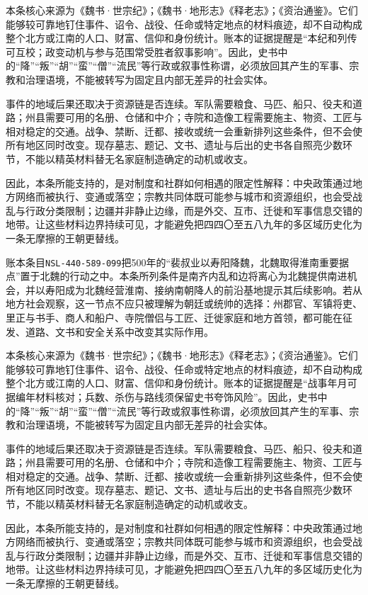 本条核心来源为《魏书·世宗纪》；《魏书·地形志》《释老志》；《资治通鉴》。它们能够较可靠地钉住事件、诏令、战役、任命或特定地点的材料痕迹，却不自动构成整个北方或江南的人口、财富、信仰和身份统计。账本的证据提醒是“本纪和列传可互校；政变动机与参与范围常受胜者叙事影响”。因此，史书中的“降”“叛”“胡”“蛮”“僧”“流民”等行政或叙事性称谓，必须放回其产生的军事、宗教和治理语境，不能被转写为固定且内部无差异的社会实体。

事件的地域后果还取决于资源链是否连续。军队需要粮食、马匹、船只、役夫和道路；州县需要可用的名册、仓储和中介；寺院和造像工程需要施主、物资、工匠与相对稳定的交通。战争、禁断、迁都、接收或统一会重新排列这些条件，但不会使所有地区同时改变。现存墓志、题记、文书、遗址与后出的史书各自照亮少数环节，不能以精英材料替无名家庭制造确定的动机或收支。

因此，本条所能支持的，是对制度和社群如何相遇的限定性解释：中央政策通过地方网络而被执行、变通或落空；宗教共同体既可能参与城市和资源组织，也会受战乱与行政分类限制；边疆并非静止边缘，而是外交、互市、迁徙和军事信息交错的地带。让这些材料边界持续可见，才能避免把四四〇至五八九年的多区域历史化为一条无摩擦的王朝更替线。

账本条目\texttt{NSL-440-589-099}把500年的“裴叔业以寿阳降魏，北魏取得淮南重要据点”置于北魏的行动之中。本条所列条件是南齐内乱和边将离心为北魏提供南进机会，并以寿阳成为北魏经营淮南、接纳南朝降人的前沿基地提示其后续影响。若从地方社会观察，这一节点不应只被理解为朝廷或统帅的选择：州郡官、军镇将吏、里正与书手、商人和船户、寺院僧侣与工匠、迁徙家庭和地方首领，都可能在征发、道路、文书和安全关系中改变其实际作用。

本条核心来源为《魏书·世宗纪》；《魏书·地形志》《释老志》；《资治通鉴》。它们能够较可靠地钉住事件、诏令、战役、任命或特定地点的材料痕迹，却不自动构成整个北方或江南的人口、财富、信仰和身份统计。账本的证据提醒是“战事年月可据编年材料核对；兵数、杀伤与路线须保留史书夸饰风险”。因此，史书中的“降”“叛”“胡”“蛮”“僧”“流民”等行政或叙事性称谓，必须放回其产生的军事、宗教和治理语境，不能被转写为固定且内部无差异的社会实体。

事件的地域后果还取决于资源链是否连续。军队需要粮食、马匹、船只、役夫和道路；州县需要可用的名册、仓储和中介；寺院和造像工程需要施主、物资、工匠与相对稳定的交通。战争、禁断、迁都、接收或统一会重新排列这些条件，但不会使所有地区同时改变。现存墓志、题记、文书、遗址与后出的史书各自照亮少数环节，不能以精英材料替无名家庭制造确定的动机或收支。

因此，本条所能支持的，是对制度和社群如何相遇的限定性解释：中央政策通过地方网络而被执行、变通或落空；宗教共同体既可能参与城市和资源组织，也会受战乱与行政分类限制；边疆并非静止边缘，而是外交、互市、迁徙和军事信息交错的地带。让这些材料边界持续可见，才能避免把四四〇至五八九年的多区域历史化为一条无摩擦的王朝更替线。


